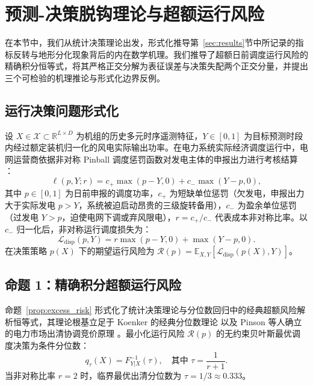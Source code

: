 \section{预测-决策脱钩理论与超额运行风险}
\label{sec:theory}

在本节中，我们从统计决策理论出发，形式化推导第~\ref{sec:results}节中所记录的指标反转与地形分化现象背后的内在数学机理。我们推导了超额日前调度运行风险的精确积分恒等式，将其严格正交分解为表征误差与决策失配两个正交分量，并提出三个可检验的机理推论与形式化边界反例。

\subsection{运行决策问题形式化}
设 $X \in \mathcal{X} \subset \mathbb{R}^{L \times D}$ 为机组的历史多元时序遥测特征，$Y \in [0, 1]$ 为目标预测时段内经过额定装机归一化的风电实际输出功率。在电力系统实际经济调度运行中，电网运营商依据非对称 Pinball 调度惩罚函数对发电主体的申报出力进行考核结算 \cite{weron2014,zhang2014wind}：
\begin{equation}
\ell(p, Y; r) = c_+ \max(p - Y, 0) + c_- \max(Y - p, 0),
\label{eq:pinball_loss}
\end{equation}
其中 $p \in [0, 1]$ 为日前申报的调度功率，$c_+$ 为短缺单位惩罚（欠发电，申报出力大于实际发电 $p > Y$，系统被迫启动昂贵的三级旋转备用），$c_-$ 为盈余单位惩罚（过发电 $Y > p$，迫使电网下调或弃风限电），$r = c_+ / c_-$ 代表成本非对称比率。以 $c_-$ 归一化后，非对称运行调度损失为：
\begin{equation}
\mathcal{L}_{\text{disp}}(p, Y) = r \max(p - Y, 0) + \max(Y - p, 0).
\label{eq:norm_disp_loss}
\end{equation}
在决策策略 $p(X)$ 下的期望运行风险为 $\mathcal{R}(p) = \mathbb{E}_{X, Y} [\mathcal{L}_{\text{disp}}(p(X), Y)]$。

\subsection{命题 1：精确积分超额运行风险}
命题~\ref{prop:excess_risk} 形式化了统计决策理论与分位数回归中的经典超额风险解析恒等式，其理论根基立足于 Koenker 的经典分位数理论 \cite{koenker2005} 以及 Pinson 等人确立的电力市场出清协调竞价原理 \cite{pinson2007trading}。最小化运行风险 $\mathcal{R}(p)$ 的无约束贝叶斯最优调度决策为条件分位数：
\begin{equation}
q_\tau(X) = F_{Y|X}^{-1}(\tau), \quad \text{其中 } \tau = \frac{1}{r + 1}.
\label{eq:bayes_quantile}
\end{equation}
当非对称比率 $r=2$ 时，临界最优出清分位数为 $\tau = 1/3 \approx 0.333$。

